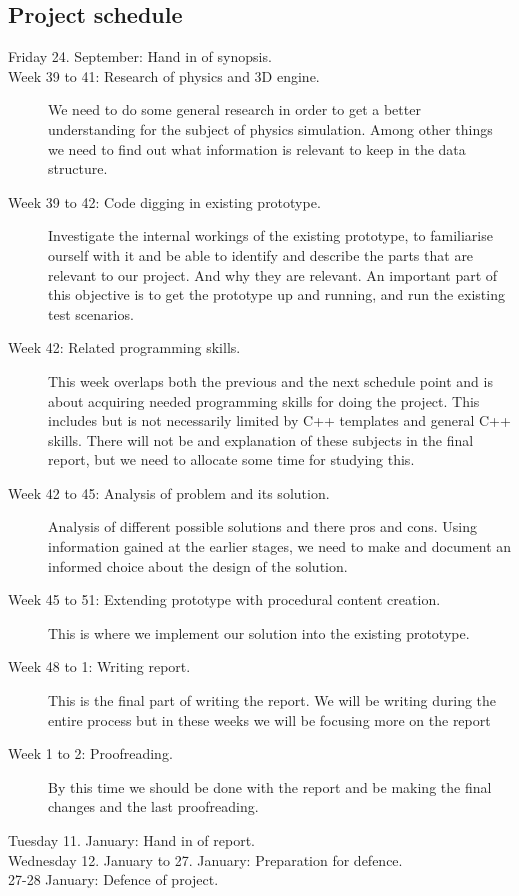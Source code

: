 \documentclass[a4paper, 10pt]{article}
\begin{document}
\subsection*{Project schedule}
\begin{description}
\item[Friday 24. September: Hand in of synopsis.]
\item[Week 39 to 41: Research of physics and 3D engine.] We need to do some general research in order to get a better
							understanding for the subject of physics simulation. 
							Among other things we need to find out what information is relevant to keep in the
							data structure. 

\item[Week 39 to 42: Code digging in existing prototype.]Investigate the internal workings of the existing prototype, to familiarise ourself 
							with it and be able to identify and describe 
							the parts that are relevant to our project. And why they are relevant.
							An important part of this objective is to get the prototype up and running, 
							and run the existing test scenarios.
\item[Week 42: Related programming skills.] This week overlaps both the previous and the next schedule point and is about acquiring needed 
					   programming skills for doing the project. This includes but is not necessarily limited by C++ 
					   templates and general C++ skills. There will not be and explanation of these subjects in the 
					   final report, but we need to allocate some time for studying this.

\item[Week 42 to 45: Analysis of problem and its solution.] Analysis of different possible solutions and there pros and cons. Using information
							    gained at the earlier stages, we need to make and document an informed choice 
							    about the design of the solution.

\item[Week 45 to 51: Extending prototype with procedural content creation.] 	This is where we implement our solution into
										the existing prototype.

\item[Week 48 to 1: Writing report.]
							This is the final part of writing the report. 
							We will be writing during the entire process but in these weeks we will be
							focusing more on the report

\item[Week 1 to 2:  Proofreading.]			By this time we should be done with the report and be 
							making the final changes and the last proofreading.
\item[Tuesday 11. January: Hand in of report.]
\item[Wednesday 12. January to 27. January: Preparation for defence.]
\item[27-28 January: Defence of project.]
\end{description}
\end{document}

